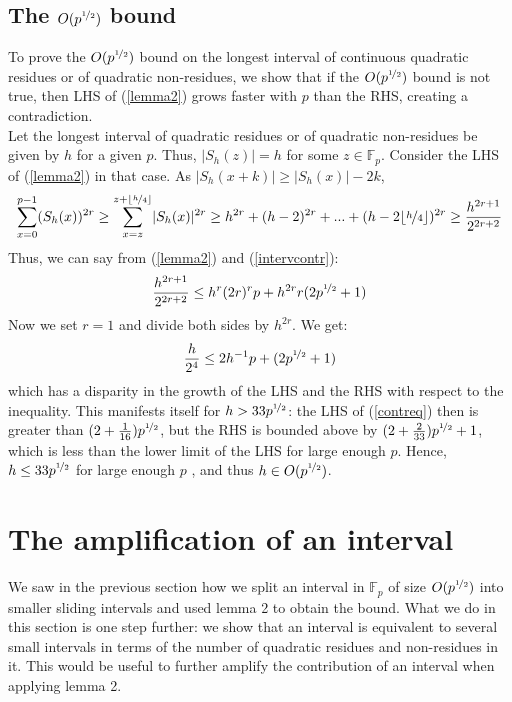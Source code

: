 \documentclass{report}
\begin{document}
\subsection{The $O(p^{\nicefrac{1}{2}})$ bound}
To prove the $O(p^{\nicefrac{1}{2}})$ bound on the longest interval of continuous quadratic residues or of quadratic non-residues, we show that if the $O(p^{\nicefrac{1}{2}})$ bound is not true, then LHS of (\ref{lemma2}) grows faster with $p$ than the RHS, creating a contradiction.\\
Let the longest interval of quadratic residues or of quadratic non-residues be given by $h$ for a given $p$. Thus, $\lvert S_h(z)\rvert=h$ for some $z\in \mathbb{F}_p$. Consider the LHS of (\ref{lemma2}) in that case. As $\lvert S_h(x+k)\rvert \geq \lvert S_h(x)\rvert-2k$,
\begin{equation} \label{intervcontr}
\sum\limits_{x=0}^{p-1}(S_h(x))^{2r}\geq\sum\limits_{x=z}^{z+\lfloor\nicefrac{h}{4}\rfloor}\lvert S_h(x)\rvert^{2r} \geq h^{2r}+(h-2)^{2r}+...+(h-2\lfloor\nicefrac{h}{4}\rfloor)^{2r} \geq \frac{h^{2r+1}}{2^{2r+2}}
\end{equation}
Thus, we can say from (\ref{lemma2}) and (\ref{intervcontr}):
$$ \frac{h^{2r+1}}{2^{2r+2}} \leq h^{r}(2r)^{r}p+h^{2r}r(2p^{\nicefrac{1}{2}}+1)$$
Now we set $r=1$ and divide both sides by $h^{2r}$. We get:
\begin{equation} \label{contreq}
\frac{h}{2^{4}} \leq 2h^{-1}p+(2p^{\nicefrac{1}{2}}+1)
\end{equation}
which has a disparity in the growth of the LHS and the RHS with respect to the inequality. This manifests itself for $h>33p^{\nicefrac{1}{2}}$: the LHS of (\ref{contreq}) then is greater than $(2+\frac{1}{16})p^{\nicefrac{1}{2}}$, but the RHS is bounded above by $(2+\frac{2}{33})p^{\nicefrac{1}{2}}+1$, which is less than the lower limit of the LHS for large enough $p$. Hence, $h\leq 33p^{\nicefrac{1}{2}}$ for large enough $p$ , and thus $h\in O(p^{\nicefrac{1}{2}})$.
%
%
\section{The amplification of an interval}
We saw in the previous section how we split an interval in $\mathbb{F}_p$ of size $O(p^{\nicefrac{1}{2}})$ into smaller sliding intervals and used lemma 2 to obtain the bound. What we do in this section is one step further: we show that an interval is equivalent to several small intervals in terms of the number of quadratic residues and non-residues in it. This would be useful to further amplify the contribution of an interval when applying lemma 2.
\end{document}
